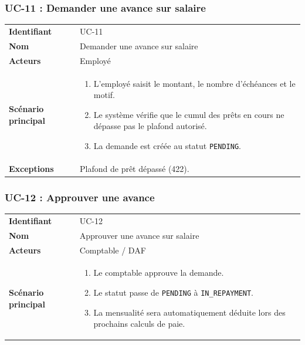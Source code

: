\documentclass[a4paper,12pt,openany]{book}
\begin{document}
    \subsubsection*{UC-11 : Demander une avance sur salaire}
    \begin{table}[H]
        \centering
        \begin{tabularx}{\textwidth}{lX}
    \toprule
    \textbf{Identifiant} & UC-11 \\
    \textbf{Nom}         & Demander une avance sur salaire \\
    \textbf{Acteurs}     & Employé \\
    \midrule
    \textbf{Scénario principal} &
    \begin{enumerate}[nosep]
      \item L'employé saisit le montant, le nombre d'échéances et le motif.
      \item Le système vérifie que le cumul des prêts en cours ne dépasse pas le plafond autorisé.
      \item La demande est créée au statut \texttt{PENDING}.
    \end{enumerate} \\
    \textbf{Exceptions} & Plafond de prêt dépassé (422). \\
    \bottomrule
        \end{tabularx}
    \end{table}

    \subsubsection*{UC-12 : Approuver une avance}
    \begin{table}[H]
        \centering
        \begin{tabularx}{\textwidth}{lX}
    \toprule
    \textbf{Identifiant} & UC-12 \\
    \textbf{Nom}         & Approuver une avance sur salaire \\
    \textbf{Acteurs}     & Comptable / DAF \\
    \midrule
    \textbf{Scénario principal} &
    \begin{enumerate}[nosep]
      \item Le comptable approuve la demande.
      \item Le statut passe de \texttt{PENDING} à \texttt{IN\_REPAYMENT}.
      \item La mensualité sera automatiquement déduite lors des prochains calculs de paie.
    \end{enumerate} \\
    \bottomrule
        \end{tabularx}
    \end{table}
\end{document}
